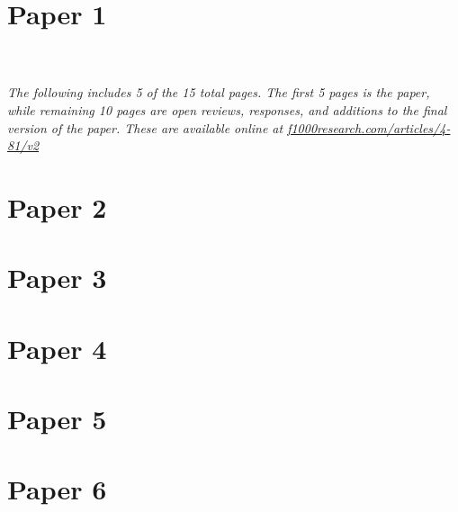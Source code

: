 \documentclass[USenglish,phd]{uit-thesis}
\begin{document}
\appendix
\begin{appendix}
    \chapter{Paper 1} 
     \\~\\
    \emph{ The following includes 5 of the 15 total pages. The first 5 pages is
    the paper, while remaining 10 pages are open reviews, responses, and
    additions to the final version of the paper. These are available online at
    \url{f1000research.com/articles/4-81/v2}}
    
    \newpage
    
    \chapter{Paper 2} 
    

    \chapter{Paper 3} 
    

    \chapter{Paper 4} 
    

    \chapter{Paper 5} 
    

    \chapter{Paper 6} 
    
\end{appendix}
\end{document}
